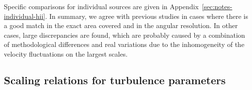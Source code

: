 \documentclass[fleqn,usenatbib, useAMS, a4paper]{mnras}
\newcounter{ionstage}
\renewcommand{\ion}[2]{\setcounter{ionstage}{#2}%
  \ensuremath{\mathrm{#1\,\scriptstyle\Roman{ionstage}}}}
\newcommand\hii{\ion{H}{2}}
\newcommand\halpha{H${\alpha}$}
\begin{document}
Specific comparisons for individual sources are given
in Appendix~\ref{sec:notes-individual-hii}.
In summary, we agree with previous studies in cases where there
is a good match in the exact area covered and in the angular resolution.
In other cases, large discrepancies are found,
which are probably caused by a combination of methodological differences
and real variations due to the inhomogeneity of the
velocity fluctuations on the largest scales.

\subsection{Scaling relations for turbulence parameters}\label{sec:scaling-relations}

\end{document}
